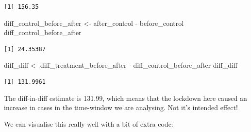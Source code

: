 \documentclass[
  letterpaper,
  DIV=11,
  numbers=noendperiod]{scrreprt}
\newenvironment{Shaded}{\begin{snugshade}}{\end{snugshade}}
\newcommand{\NormalTok}[1]{\textcolor[rgb]{0.00,0.23,0.31}{#1}}
\newcommand{\OtherTok}[1]{\textcolor[rgb]{0.00,0.23,0.31}{#1}}
\newcommand{\SpecialCharTok}[1]{\textcolor[rgb]{0.37,0.37,0.37}{#1}}
\begin{document}
\begin{verbatim}
[1] 156.35
\end{verbatim}

\begin{Shaded}
\begin{Highlighting}[]
\NormalTok{diff\_control\_before\_after }\OtherTok{\textless{}{-}}\NormalTok{ after\_control }\SpecialCharTok{{-}}\NormalTok{ before\_control}
\NormalTok{diff\_control\_before\_after}
\end{Highlighting}
\end{Shaded}

\begin{verbatim}
[1] 24.35387
\end{verbatim}

\begin{Shaded}
\begin{Highlighting}[]
\NormalTok{diff\_diff }\OtherTok{\textless{}{-}}\NormalTok{ diff\_treatment\_before\_after }\SpecialCharTok{{-}}\NormalTok{ diff\_control\_before\_after}
\NormalTok{diff\_diff}
\end{Highlighting}
\end{Shaded}

\begin{verbatim}
[1] 131.9961
\end{verbatim}

The diff-in-diff estimate is 131.99, which means that the lockdown here
caused an increase in cases in the time-window we are analysing. Not
it's intended effect!

We can visualise this really well with a bit of extra code:
\end{document}
